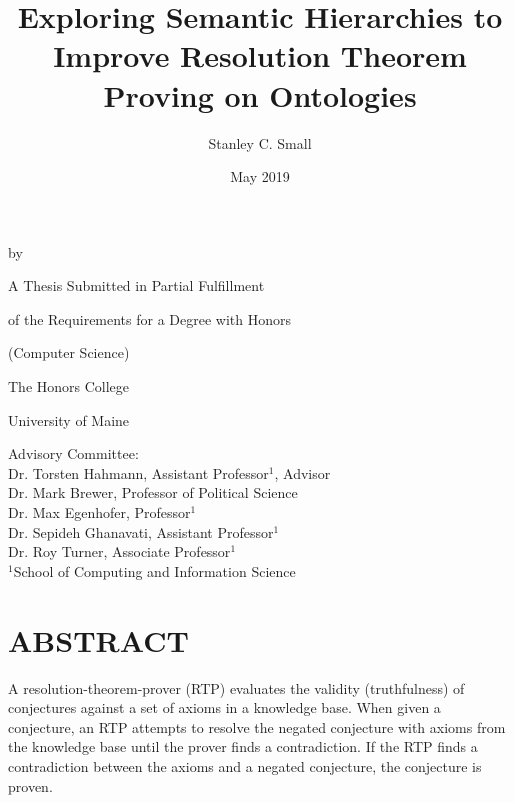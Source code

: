 \documentclass{article}
\title{Exploring Semantic Hierarchies to Improve Resolution Theorem Proving on Ontologies}
\author{Stanley C. Small}
\date{May 2019}
\begin{document}
\begin{titlepage}
	\makeatletter
		\begin{center}
   				\MakeUppercase{\@title} \par
  				\smallskip 
 				\vspace{.15in} by \par
 				\smallskip
  				\vspace{.15in} \@author \par
  				\vspace{1.5in}
 				A Thesis Submitted in Partial Fulfillment  \par
  				of the Requirements for a Degree with Honors \par
  				(Computer Science) \par
  				\vspace{1.75in}
  				The Honors College \par
  				University of Maine \par
  				\@date \par
 				\vfill
   		\end{center}
	\makeatother
	\begin{flushleft}
		Advisory Committee: \\
		\hspace{.3in} Dr. Torsten Hahmann, Assistant Professor$^{1}$, Advisor \\
		\hspace{.3in} Dr. Mark Brewer, Professor of Political Science \\
		\hspace{.3in} Dr. Max Egenhofer, Professor$^{1}$ \\
		\hspace{.3in} Dr. Sepideh Ghanavati, Assistant Professor$^{1}$ \\
		\hspace{.3in} Dr. Roy Turner, Associate Professor$^{1}$ \\
		\hfill \break
		\hspace{.3in} $^{1}$School of Computing and Information Science
	\end{flushleft}
\end{titlepage}

\newpage
{}
\vspace*{.05in}
\section*{\MakeUppercase{Abstract}}
A resolution-theorem-prover (RTP) evaluates the validity (truthfulness) of conjectures against a set of axioms in a knowledge base. When given a conjecture, an RTP attempts to resolve the negated conjecture with axioms from the knowledge base until the prover finds a contradiction. If the RTP finds a contradiction between the axioms and a negated conjecture, the conjecture is proven. 
\end{document}
